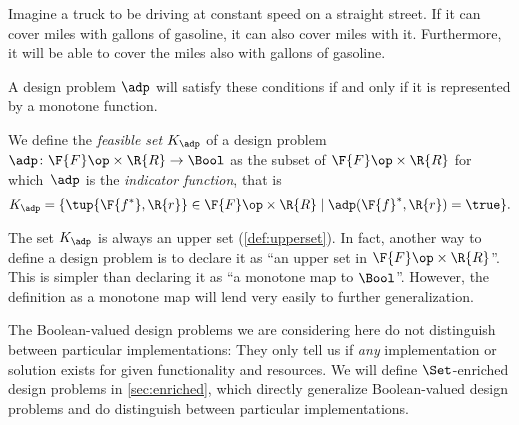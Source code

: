 \begin{example}
Imagine a truck to be driving at constant speed on a straight street. If it can cover \unit[100]{miles} with \unit[5]{gallons} of gasoline, it can also cover \unit[80]{miles} with it. Furthermore, it will be able to cover the \unit[100]{miles} also with \unit[10]{gallons} of gasoline.
\end{example}

A design problem $\adp$ will satisfy these conditions if and only if it is represented by a monotone function. 
\begin{definition}
We define the \emph{feasible set} $K_\adp$ of a design problem $\adp\colon \F{F}\op \times \R{R}\to \Bool$ as the subset of $\F{F} \op\times \R{R}$ for which~$\adp$ is the \emph{indicator function}, that is
\begin{equation}
    K_\adp = \{ \tup{\F{f^*},\R{r}} \in \F{F} \op\times \R{R}  \mid
            \adp(\F{f}^*, \R{r}) = \true
                \}.
\end{equation}
\end{definition}
\begin{remark}
The set $K_\adp$ is always an upper set (\cref{def:upperset}). In fact, another way to define a design problem is to declare it as ``an upper
set in $\F{F}\op \times \R{R}$''. This is simpler than declaring it as ``a monotone map to $\Bool$''. However, the
definition as a monotone map will lend very easily to further generalization.
\end{remark}
The Boolean-valued design problems we are considering here do not distinguish between particular implementations: They only tell us if \emph{any} implementation or solution exists for given functionality and resources. We will define $\Set$-enriched design problems in \cref{sec:enriched}, which directly generalize Boolean-valued design problems and do distinguish between particular implementations.

